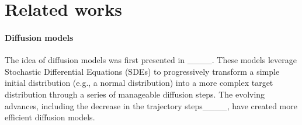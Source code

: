 \section{Related works}
\paragraph{Diffusion models}

The idea of diffusion models was first presented in ____. These models leverage Stochastic Differential Equations (SDEs) to progressively transform a simple initial distribution (e.g., a normal distribution) into a more complex target distribution through a series of manageable diffusion steps. The evolving advances, including the decrease in the trajectory steps____, have created more efficient diffusion models.

